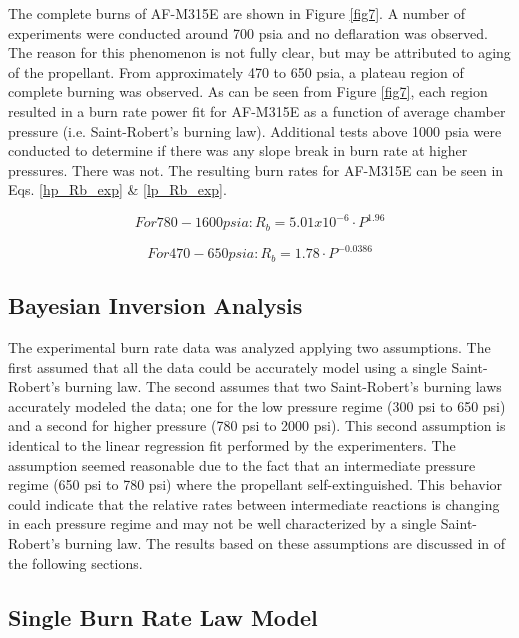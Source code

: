 \documentclass{article}
\begin{document}
The complete burns of AF-M315E are shown in Figure \ref{fig7}. A number of experiments were conducted around 700
psia and no deflaration was observed. The reason for this phenomenon is not fully clear, but may be attributed to
aging of the propellant. From approximately 470 to 650 psia, a plateau region of complete burning was observed. As
can be seen from Figure \ref{fig7}, each region resulted in a burn rate power fit for AF-M315E as a function of 
average chamber pressure (i.e. Saint-Robert's burning law). Additional tests above 1000 psia were conducted to
determine if there was any slope break in burn rate at higher pressures. There was not. The resulting burn rates 
for AF-M315E can be seen in Eqs. \ref{hp_Rb_exp} \& \ref{lp_Rb_exp}. 

\begin{equation} \label{hp_Rb_exp}
For 780 - 1600 psia:	R_b=5.01x10^{-6} \cdot P^{1.96}
\end{equation}

\begin{equation} \label{lp_Rb_exp}
For 470 - 650 psia:	R_b=1.78 \cdot P^{-0.0386}
\end{equation}


\subsection{Bayesian Inversion Analysis} \label{resultsBayes}

The experimental burn rate data was analyzed applying two assumptions. The first assumed
that all the data could be accurately model using a single Saint-Robert's burning law. The second 
assumes that two Saint-Robert's burning laws accurately modeled the data; one for the low pressure 
regime (300 psi to 650 psi) and a second for higher pressure (780 psi to 2000 psi). This 
second assumption is identical to the linear regression fit performed by the experimenters. The assumption
seemed reasonable due to the fact that an intermediate 
pressure regime (650 psi to 780 psi) where the propellant self-extinguished. This behavior 
could indicate that the relative rates between intermediate reactions is changing in each 
pressure regime and may not be well characterized by a single Saint-Robert's burning law. 
The results based on these assumptions are discussed in of the following sections.

\subsection{Single Burn Rate Law Model} \label{singleRate}
\end{document}
